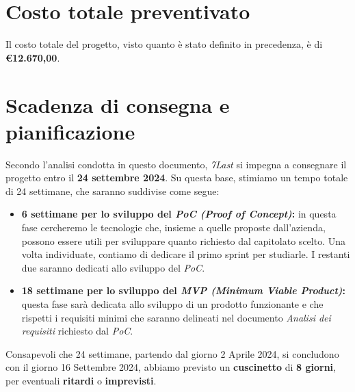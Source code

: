 \documentclass[italian,12pt]{article} %
\begin{document}
\section{Costo totale preventivato}
Il costo totale del progetto, visto quanto è stato definito in precedenza, è di \textbf{€12.670,00}.

\newpage

\section{Scadenza di consegna e pianificazione}
Secondo l'analisi condotta in questo documento, \textit{7Last} si impegna a consegnare il progetto entro il \textbf{24 settembre 2024}. Su questa base, stimiamo un tempo totale di 24 settimane, che saranno suddivise come segue:
\begin{itemize}
    \item \textbf{6 settimane per lo sviluppo del \textit{PoC (Proof of Concept)}:} in questa fase cercheremo le tecnologie che, insieme a quelle proposte dall'azienda, possono essere utili per sviluppare quanto richiesto dal capitolato scelto. Una volta individuate, contiamo di dedicare il primo sprint per studiarle. I restanti due saranno dedicati allo sviluppo del \textit{PoC}.
    \item \textbf{18 settimane per lo sviluppo del \textit{MVP (Minimum Viable Product)}:} questa fase sarà dedicata allo sviluppo di un prodotto funzionante e che rispetti i requisiti minimi che saranno delineati nel documento \textit{Analisi dei requisiti} richiesto dal \textit{PoC}.
\end{itemize}
Consapevoli che 24 settimane, partendo dal giorno 2 Aprile 2024, si concludono con il giorno 16 Settembre 2024, abbiamo previsto un \textbf{cuscinetto} di \textbf{8 giorni}, per eventuali \textbf{ritardi} o \textbf{imprevisti}.
\end{document}
